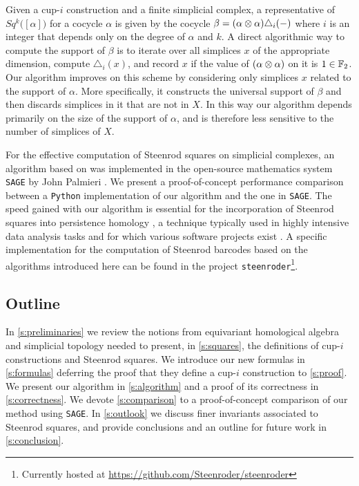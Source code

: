 Given a cup-$i$ construction and a finite simplicial complex, a representative of $Sq^k \big( [\alpha] \big)$ for a cocycle $\alpha$ is given by the cocycle $\beta = (\alpha \otimes \alpha) \triangle_{i}(-)$ where $i$ is an integer that depends only on the degree of $\alpha$ and $k$.
A direct algorithmic way to compute the support of $\beta$ is to iterate over all simplices $x$ of the appropriate dimension, compute $\triangle_i(x)$, and record $x$ if the value of $(\alpha \otimes \alpha)$ on it is $1 \in {\mathbb{F}_2}$.
Our algorithm improves on this scheme by considering only simplices $x$ related to the support of $\alpha$.
More specifically, it constructs the universal support of $\beta$ and then discards simplices in it that are not in $X$.
In this way our algorithm depends primarily on the size of the support of $\alpha$, and is therefore less sensitive to the number of simplices of $X$.

For the effective computation of Steenrod squares on simplicial complexes, an algorithm based on \cite{gonzalez-diaz1999steenrod} was implemented in the open-source mathematics system \verb|SAGE| by John Palmieri \cite{sagemath}.
We present a proof-of-concept performance comparison between a \verb|Python| implementation of our algorithm and the one in \verb|SAGE|.
The speed gained with our algorithm is essential for the incorporation of Steenrod squares into persistence homology \cite{medina2018persistence}, a technique typically used in highly intensive data analysis tasks \cite{carlsson2008images, chan2013viral, lee2017quantifying} and for which various software projects exist \cite{bauer2021ripser, gudhi, medina2021giotto}.
A specific implementation for the computation of Steenrod barcodes based on the algorithms introduced here can be found in the project \texttt{steenroder}\footnote{Currently hosted at \url{https://github.com/Steenroder/steenroder}}.

\subsection*{Outline}

In \cref{s:preliminaries} we review the notions from equivariant homological algebra and simplicial topology needed to present, in \cref{s:squares}, the definitions of cup-$i$ constructions and Steenrod squares.
We introduce our new formulas in \cref{s:formulas} deferring the proof that they define a cup-$i$ construction to \cref{s:proof}.
We present our algorithm in \cref{s:algorithm} and a proof of its correctness in \cref{s:correctness}.
We devote \cref{s:comparison} to a proof-of-concept comparison of our method using \verb|SAGE|.
In \cref{s:outlook} we discuss finer invariants associated to Steenrod squares, and provide conclusions and an outline for future work in \cref{s:conclusion}.